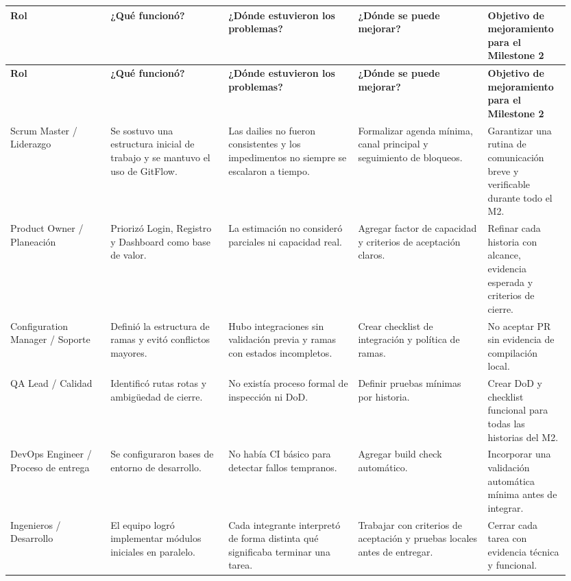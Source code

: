 \documentclass[11pt,a4paper]{article}
\begin{document}
\begin{landscape}
\begingroup
\tiny
\setlength{\tabcolsep}{3pt}
\begin{longtable}{P{0.17\linewidth}P{0.20\linewidth}P{0.22\linewidth}P{0.22\linewidth}P{0.14\linewidth}}
\toprule
\textbf{Rol} & \textbf{¿Qué funcionó?} & \textbf{¿Dónde estuvieron los problemas?} & \textbf{¿Dónde se puede mejorar?} & \textbf{Objetivo de mejoramiento para el Milestone 2} \\
\midrule
\endfirsthead
\toprule
\textbf{Rol} & \textbf{¿Qué funcionó?} & \textbf{¿Dónde estuvieron los problemas?} & \textbf{¿Dónde se puede mejorar?} & \textbf{Objetivo de mejoramiento para el Milestone 2} \\
\midrule
\endhead
\bottomrule
\endlastfoot
Scrum Master / Liderazgo & Se sostuvo una estructura inicial de trabajo y se mantuvo el uso de GitFlow. & Las dailies no fueron consistentes y los impedimentos no siempre se escalaron a tiempo. & Formalizar agenda mínima, canal principal y seguimiento de bloqueos. & Garantizar una rutina de comunicación breve y verificable durante todo el M2. \\
Product Owner / Planeación & Priorizó Login, Registro y Dashboard como base de valor. & La estimación no consideró parciales ni capacidad real. & Agregar factor de capacidad y criterios de aceptación claros. & Refinar cada historia con alcance, evidencia esperada y criterios de cierre. \\
Configuration Manager / Soporte & Definió la estructura de ramas y evitó conflictos mayores. & Hubo integraciones sin validación previa y ramas con estados incompletos. & Crear checklist de integración y política de ramas. & No aceptar PR sin evidencia de compilación local. \\
QA Lead / Calidad & Identificó rutas rotas y ambigüedad de cierre. & No existía proceso formal de inspección ni DoD. & Definir pruebas mínimas por historia. & Crear DoD y checklist funcional para todas las historias del M2. \\
DevOps Engineer / Proceso de entrega & Se configuraron bases de entorno de desarrollo. & No había CI básico para detectar fallos tempranos. & Agregar build check automático. & Incorporar una validación automática mínima antes de integrar. \\
Ingenieros / Desarrollo & El equipo logró implementar módulos iniciales en paralelo. & Cada integrante interpretó de forma distinta qué significaba terminar una tarea. & Trabajar con criterios de aceptación y pruebas locales antes de entregar. & Cerrar cada tarea con evidencia técnica y funcional. \\
\end{longtable}
\endgroup
\end{landscape}
\end{document}
